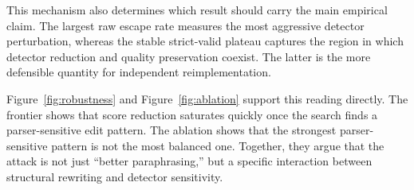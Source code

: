 This mechanism also determines which result should carry the main empirical claim. The largest raw escape rate measures the most aggressive detector perturbation, whereas the stable strict-valid plateau captures the region in which detector reduction and quality preservation coexist. The latter is the more defensible quantity for independent reimplementation.

Figure~\ref{fig:robustness} and Figure~\ref{fig:ablation} support this reading directly. The frontier shows that score reduction saturates quickly once the search finds a parser-sensitive edit pattern. The ablation shows that the strongest parser-sensitive pattern is not the most balanced one. Together, they argue that the attack is not just ``better paraphrasing,'' but a specific interaction between structural rewriting and detector sensitivity.
